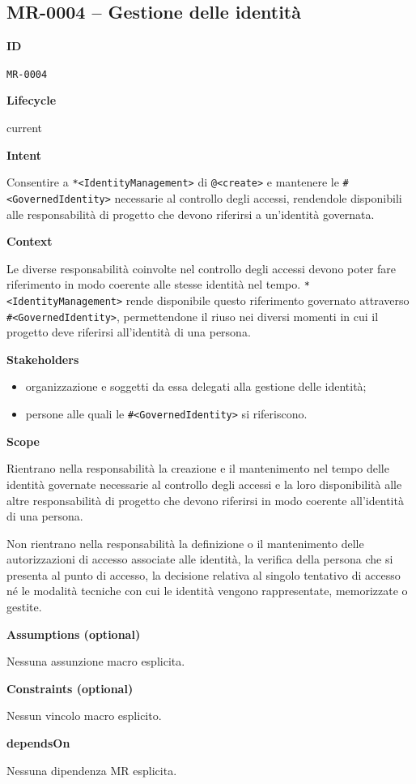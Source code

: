 \documentclass[11pt,a4paper]{article}
\makeatletter
\newcommand{\bbeh}[1]{\texttt{*<#1>}}
\newcommand{\bnon}[1]{\texttt{\#<#1>}}
\newcommand{\baop}[1]{\texttt{@<#1>}}
\newcommand{\Field}[1]{\par\medskip\noindent\textbf{#1}\par\smallskip}
\newenvironment{compactitems}{\begin{itemize}[leftmargin=1.35em,itemsep=0.1em,topsep=0.2em,parsep=0pt]}{\end{itemize}}
\makeatother
\begin{document}
\noindent
\begin{minipage}[t]{0.64\textwidth}\small
\subsection*{MR-0004 -- Gestione delle identit\`a}

\Field{ID} \texttt{MR-0004}

\Field{Lifecycle} current

\Field{Intent}
Consentire a \bbeh{IdentityManagement} di \baop{create} e mantenere le \bnon{GovernedIdentity} necessarie al controllo degli accessi, rendendole disponibili alle responsabilit\`a di progetto che devono riferirsi a un'identit\`a governata.

\Field{Context}
Le diverse responsabilit\`a coinvolte nel controllo degli accessi devono poter fare riferimento in modo coerente alle stesse identit\`a nel tempo. \bbeh{IdentityManagement} rende disponibile questo riferimento governato attraverso \bnon{GovernedIdentity}, permettendone il riuso nei diversi momenti in cui il progetto deve riferirsi all'identit\`a di una persona.

\Field{Stakeholders}
\begin{compactitems}
  \item organizzazione e soggetti da essa delegati alla gestione delle identit\`a;
  \item persone alle quali le \bnon{GovernedIdentity} si riferiscono.
\end{compactitems}

\Field{Scope}
Rientrano nella responsabilit\`a la creazione e il mantenimento nel tempo delle identit\`a governate necessarie al controllo degli accessi e la loro disponibilit\`a alle altre responsabilit\`a di progetto che devono riferirsi in modo coerente all'identit\`a di una persona.

Non rientrano nella responsabilit\`a la definizione o il mantenimento delle autorizzazioni di accesso associate alle identit\`a, la verifica della persona che si presenta al punto di accesso, la decisione relativa al singolo tentativo di accesso n\'e le modalit\`a tecniche con cui le identit\`a vengono rappresentate, memorizzate o gestite.

\Field{Assumptions (optional)} Nessuna assunzione macro esplicita.

\Field{Constraints (optional)} Nessun vincolo macro esplicito.

\Field{dependsOn} Nessuna dipendenza MR esplicita.
\end{minipage}\hfill
\end{document}
